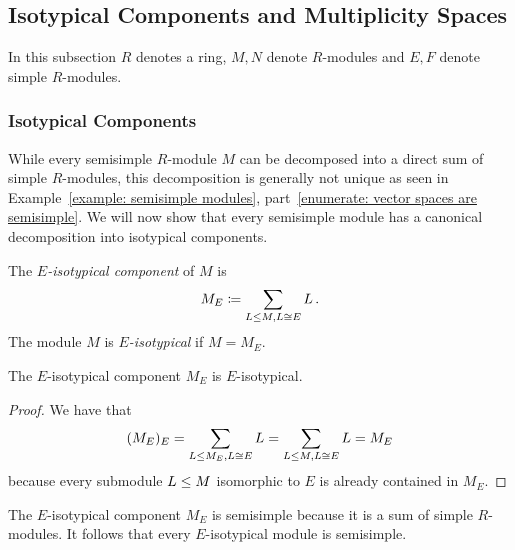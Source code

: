 \subsection{Isotypical Components and Multiplicity Spaces}
\label{subsection: isotyipical components and multiplicity spaces}


\begin{conventions}
  In this subsection $R$ denotes a ring, $M, N$ denote $R$-modules and $E, F$ denote simple $R$-modules.
\end{conventions}





\subsubsection{Isotypical Components}


\begin{fluff}
  While every semisimple $R$-module $M$ can be decomposed into a direct sum of simple $R$-modules, this decomposition is generally not unique as seen in Example~\ref{example: semisimple modules}, part~\ref*{enumerate: vector spaces are semisimple}.
  We will now show that every semisimple module has a canonical decomposition into isotypical components.
\end{fluff}


\begin{definition}
  The \emph{$E$-isotypical component} of $M$ is
  \[
              M_E
    \coloneqq  \sum_{L \leq M, L \cong E} L \,.
  \]
  The module $M$ is \emph{$E$-isotypical} if $M = M_E$.
\end{definition}


\begin{lemma}
  The $E$-isotypical component $M_E$ is $E$-isotypical.
\end{lemma}


\begin{proof}
  We have that
  \[
      (M_E)_E
    = \sum_{L \leq M_E, L \cong E} L
    = \sum_{L \leq M, L \cong E} L
    = M_E
  \]
  because every submodule $L \leq M$ isomorphic to $E$ is already contained in $M_E$.
\end{proof}


\begin{remark}
  The $E$-isotypical component $M_E$ is semisimple because it is a sum of simple $R$-modules.
  It follows that every $E$-isotypical module is semisimple.
\end{remark}


